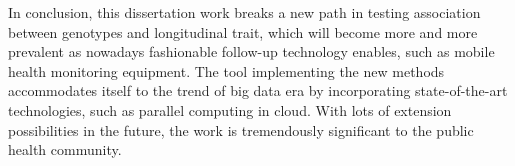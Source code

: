 \documentclass[12pt]{article}
\begin{document}
In conclusion, this dissertation work breaks a new path in testing association between genotypes and longitudinal trait, which will become more and more prevalent as nowadays fashionable follow-up technology enables, such as mobile health monitoring equipment. The tool implementing the new methods accommodates itself to the trend of big data era by incorporating state-of-the-art technologies, such as parallel computing in cloud. With lots of extension possibilities in the future, the work is tremendously significant to the public health community.








\end{document}
